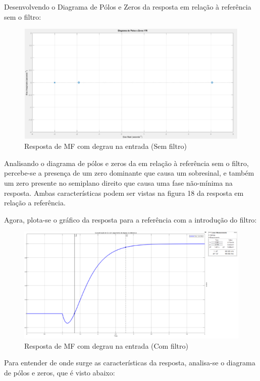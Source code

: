 \documentclass[a4paper,12pt]{report}
\begin{document}
Desenvolvendo o Diagrama de Pólos e Zeros da resposta em relação à referência sem o filtro:

\begin{figure}[H]
    \centering
    \includegraphics[width=0.8\linewidth]{Imagens/polo e zero sem filtro.png}
    \caption{Resposta de MF com degrau na entrada (Sem filtro)}
    \label{fig:enter-label}
\end{figure}

Analisando o diagrama de pólos e zeros da em relação à referência sem o filtro, percebe-se a presença de um zero dominante que causa um sobresinal, e também um zero presente no semiplano direito que causa uma fase não-mínima na resposta. Ambas características podem ser vistas na figura 18 da resposta em relação a referência. 

Agora, plota-se o gráfico da resposta para a referência com a introdução do filtro:

\begin{figure}[H]
    \centering
    \includegraphics[width=0.8\linewidth]{Imagens/resposta.png}
    \caption{Resposta de MF com degrau na entrada (Com filtro)}
    \label{fig:enter-label}
\end{figure}

Para entender de onde surge as características da resposta, analisa-se o diagrama de pólos e zeros, que é visto abaixo:
\end{document}
